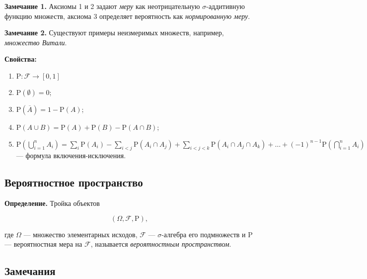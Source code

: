 \documentclass[11pt,a4paper]{article}
\providecommand{\tightlist}{%
      \setlength{\itemsep}{0pt}\setlength{\parskip}{0pt}}
\begin{document}
\textbf{Замечание 1.} Аксиомы 1 и 2 задают \emph{меру} как
неотрицательную \(\sigma\)-аддитивную функцию множеств, аксиома 3
определяет вероятность как \emph{нормированную меру}.

\textbf{Замечание 2.} Существуют примеры неизмеримых множеств, например,
\emph{множество Витали}.

    \textbf{Свойства:}

\begin{enumerate}
\def\labelenumi{\arabic{enumi}.}
\tightlist
\item
  \(\mathrm{P}: \mathcal{F} \rightarrow [0,1]\)
\item
  \(\mathrm{P}(\emptyset) = 0\);
\item
  \(\mathrm{P}(\overline{A}) = 1 - \mathrm{P}(A)\);
\item
  \(\mathrm{P}(A \cup B) = \mathrm{P}(A) + \mathrm{P}(B) - \mathrm{P}(A \cap B)\);
\item
  \(\mathrm{P}\left( \bigcup\limits_{i=1}^{n}A_i \right) = \sum\limits_{i}\mathrm{P}(A_i) - \sum\limits_{i<j}\mathrm{P}(A_i \cap A_j) + \sum\limits_{i<j<k}\mathrm{P}(A_i \cap A_j \cap A_k) + \ldots + (-1)^{n-1} \mathrm{P}\left( \bigcap\limits_{i=1}^{n}A_i \right)\)
  --- формула включения-исключения.
\end{enumerate}

    \hypertarget{ux432ux435ux440ux43eux44fux442ux43dux43eux441ux442ux43dux43eux435-ux43fux440ux43eux441ux442ux440ux430ux43dux441ux442ux432ux43e}{%
\subsection{Вероятностное
пространство}\label{ux432ux435ux440ux43eux44fux442ux43dux43eux441ux442ux43dux43eux435-ux43fux440ux43eux441ux442ux440ux430ux43dux441ux442ux432ux43e}}

\textbf{Определение.} Тройка объектов

\[ \left( \Omega, \mathcal{F}, \mathrm{P} \right), \]

где \(\Omega\) --- множество элементарных исходов, \(\mathcal{F}\) ---
\(\sigma\)-алгебра его подмножеств и \(\mathrm{P}\) --- вероятностная
мера на \(\mathcal{F}\), называется \emph{вероятностным пространством}.

    \hypertarget{ux437ux430ux43cux435ux447ux430ux43dux438ux44f}{%
\subsection{Замечания}\label{ux437ux430ux43cux435ux447ux430ux43dux438ux44f}}
\end{document}
